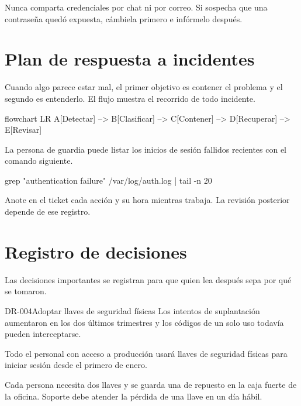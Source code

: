 \begin{warningbox}
  Nunca comparta credenciales por chat ni por correo. Si sospecha que una
  contraseña quedó expuesta, cámbiela primero e infórmelo después.
\end{warningbox}

\section{Plan de respuesta a incidentes}
Cuando algo parece estar mal, el primer objetivo es contener el problema y el
segundo es entenderlo. El flujo muestra el recorrido de todo incidente.

\begin{mermaid}[style=editorial,width=0.9\linewidth,
    caption={Flujo de respuesta a incidentes},pos=H]
  flowchart LR
  A[Detectar] --> B[Clasificar] --> C[Contener] --> D[Recuperar] --> E[Revisar]
\end{mermaid}

La persona de guardia puede listar los inicios de sesión fallidos recientes con
el comando siguiente.\par\vspace{2pt}

\begin{code}[lang=bash]
grep "authentication failure" /var/log/auth.log | tail -n 20
\end{code}

\begin{notebox}
  Anote en el ticket cada acción y su hora mientras trabaja. La revisión
  posterior depende de ese registro.
\end{notebox}

\section{Registro de decisiones}
Las decisiones importantes se registran para que quien lea después sepa por qué
se tomaron.

\begin{decision}{DR-004}{Adoptar llaves de seguridad físicas}
  \decisionpart{\lblContext}
  Los intentos de suplantación aumentaron en los dos últimos trimestres y los
  códigos de un solo uso todavía pueden interceptarse.

  \decisionpart{\lblDecision}
  Todo el personal con acceso a producción usará llaves de seguridad físicas
  para iniciar sesión desde el primero de enero.

  \decisionpart{\lblConsequences}
  Cada persona necesita dos llaves y se guarda una de repuesto en la caja fuerte
  de la oficina. Soporte debe atender la pérdida de una llave en un día hábil.
\end{decision}

